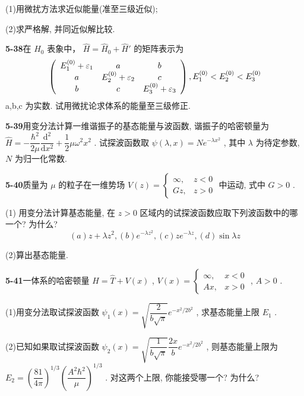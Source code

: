 (1)用微扰方法求近似能量(准至三级近似); 

(2)求严格解, 并同近似解比较.

\vfill

\newpage
\vfill

\noindent
\textbf{5-38}\quad 在 $\hat{H}_0$ 表象中， $\hat{H} = \hat{H}_0 + \hat{H}'$ 的矩阵表示为
$$
\left( \begin{array}{c c c} E _ {1} ^ {(0)} + \varepsilon_ {1} & a & b \\ a & E _ {2} ^ {(0)} + \varepsilon_ {2} & c \\ b & c & E _ {3} ^ {(0)} + \varepsilon_ {3} \end{array} \right), E _ {1} ^ {(0)} <   E _ {2} ^ {(0)} <   E _ {3} ^ {(0)}
$$
a,b,c 为实数. 试用微扰论求体系的能量至三级修正.

\vfill

\newpage
\vfill

\noindent
\textbf{5-39}\quad 用变分法计算一维谐振子的基态能量与波函数, 谐振子的哈密顿量为 $\hat{H} = -\dfrac{\hbar^2}{2\mu}\dfrac{\mathrm{d}^2}{\mathrm{d}x^2} + \dfrac{1}{2}\mu \omega^2 x^2$ . 试探波函数取 $\psi(\lambda, x) = N e^{-\lambda x^2}$ , 其中 $\lambda$ 为待定参数, $N$ 为归一化常数.

\vfill

\newpage
\vfill

\noindent
\textbf{5-40}\quad 质量为 $\mu$ 的粒子在一维势场 $V(z) = \begin{cases} \infty, & z < 0 \\ Gz, & z > 0 \end{cases}$ 中运动, 式中 $G > 0$ . 

(1) 用变分法计算基态能量, 在 $z > 0$ 区域内的试探波函数应取下列波函数中的哪一个? 为什么?
$$
(a) z + \lambda z ^ {2}, (b) e ^ {- \lambda z ^ {2}}, (c) z e ^ {- \lambda z}, (d) \sin \lambda z
$$

(2)算出基态能量.

\vfill

\newpage
\vfill

\noindent
\textbf{5-41}\quad 一体系的哈密顿量 $\hat{H} = \hat{T} + V(x)$ , $V(x) = \begin{cases} \infty, & x < 0 \\ Ax, & x > 0 \end{cases}$ , $A > 0$ . 

(1)用变分法取试探波函数 $\psi_1(x) = \sqrt{\dfrac{2}{b\sqrt{\pi}}} e^{-x^2 / 2b^2}$ , 求基态能量上限 $E_1$ . 

(2)已知如果取试探波函数 $\psi_2(x) = \sqrt{\dfrac{1}{b\sqrt{\pi}}} \dfrac{2x}{b} e^{-x^2 / 2b^2}$ , 则基态能量上限为 $E_2 = \left(\dfrac{81}{4\pi}\right)^{1/3} \left(\dfrac{A^2\hbar^2}{\mu}\right)^{1/3}$ . 对这两个上限, 你能接受哪一个? 为什么?

